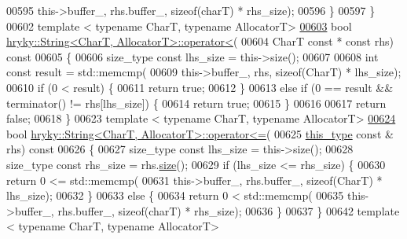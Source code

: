 \begin{DoxyCode}
00595             this->buffer\_, rhs.buffer\_, \textcolor{keyword}{sizeof}(charT) * rhs\_size);
00596     \}
00597 \}
00602 \textcolor{keyword}{template} < \textcolor{keyword}{typename} CharT, \textcolor{keyword}{typename} AllocatorT>
\hypertarget{string_8h_source_l00603}{}\hyperlink{classhryky_1_1_string_a7e287629be7b7f2e7e5228ca388c5f13}{00603} \textcolor{keywordtype}{bool} \hyperlink{namespacehryky_a7db2acd798ff6883387f9cbe3b3e820d}{hryky::String<CharT, AllocatorT>::operator<}(
00604     CharT \textcolor{keyword}{const} * \textcolor{keyword}{const} rhs)\textcolor{keyword}{ const}
00605 \textcolor{keyword}{}\{
00606     size\_type \textcolor{keyword}{const} lhs\_size = this->size();
00607     
00608     \textcolor{keywordtype}{int} \textcolor{keyword}{const} result = std::memcmp(
00609         this->buffer\_, rhs, \textcolor{keyword}{sizeof}(CharT) * lhs\_size);
00610     \textcolor{keywordflow}{if} (0 < result) \{
00611         \textcolor{keywordflow}{return} \textcolor{keyword}{true};
00612     \}
00613     \textcolor{keywordflow}{else} \textcolor{keywordflow}{if} (0 == result && terminator() != rhs[lhs\_size]) \{
00614         \textcolor{keywordflow}{return} \textcolor{keyword}{true};
00615     \}
00616     
00617     \textcolor{keywordflow}{return} \textcolor{keyword}{false};
00618 \}
00623 \textcolor{keyword}{template} < \textcolor{keyword}{typename} CharT, \textcolor{keyword}{typename} AllocatorT>
\hypertarget{string_8h_source_l00624}{}\hyperlink{classhryky_1_1_string_a8722fa391d4ee8b119092502840a4146}{00624} \textcolor{keywordtype}{bool} \hyperlink{namespacehryky_a3841c4dbefd9eeed038376b3044dec2b}{hryky::String<CharT, AllocatorT>::operator<=}(
00625     \hyperlink{classhryky_1_1_string}{this_type} \textcolor{keyword}{const} & rhs)\textcolor{keyword}{ const}
00626 \textcolor{keyword}{}\{
00627     size\_type \textcolor{keyword}{const} lhs\_size = this->size();
00628     size\_type \textcolor{keyword}{const} rhs\_size = rhs.\hyperlink{classhryky_1_1_string_a9db0f71dce7b2de86a54ab5323759265}{size}();
00629     \textcolor{keywordflow}{if} (lhs\_size <= rhs\_size) \{
00630         \textcolor{keywordflow}{return} 0 <= std::memcmp(
00631             this->buffer\_, rhs.buffer\_, \textcolor{keyword}{sizeof}(CharT) * lhs\_size);
00632     \}
00633     \textcolor{keywordflow}{else} \{
00634         \textcolor{keywordflow}{return} 0 < std::memcmp(
00635             this->buffer\_, rhs.buffer\_, \textcolor{keyword}{sizeof}(charT) * rhs\_size);
00636     \}
00637 \}
00642 \textcolor{keyword}{template} < \textcolor{keyword}{typename} CharT, \textcolor{keyword}{typename} AllocatorT>

\end{DoxyCode}
